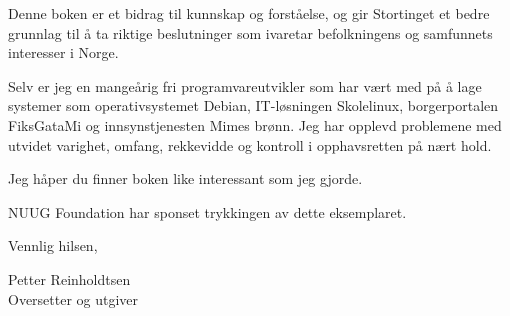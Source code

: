 \documentclass[a4paper, 11pt, norsk]{article}
\begin{document}
Denne boken er et bidrag til kunnskap og forståelse, og gir Stortinget
et bedre grunnlag til å ta riktige beslutninger som ivaretar
befolkningens og samfunnets interesser i Norge.

Selv er jeg en mangeårig fri programvareutvikler som har vært med på å
lage systemer som operativsystemet Debian, IT-løsningen Skolelinux,
borgerportalen FiksGataMi og innsynstjenesten Mimes brønn.  Jeg har
opplevd problemene med utvidet varighet, omfang, rekkevidde og
kontroll i opphavsretten på nært hold.

Jeg håper du finner boken like interessant som jeg gjorde.

NUUG Foundation har sponset trykkingen av dette eksemplaret.

Vennlig hilsen,

\vspace{4\parskip}

Petter Reinholdtsen \\
Oversetter og utgiver
\end{document}
